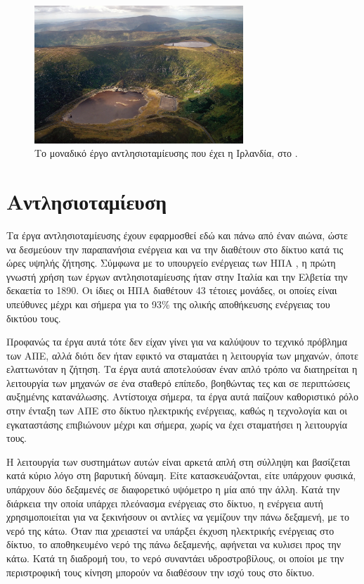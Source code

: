 \documentclass[12pt]{report}
\begin{document}
\begin{figure}[h]
				\center
				\includegraphics[width=0.7\textwidth]{turlough-hill}
				\captionsetup{name=Εικόνα, width=0.8\textwidth}
				\caption{Το μοναδικό έργο αντλησιοταμίευσης που έχει η Ιρλανδία, στο {}.}
				\label{fig:turlough-hill}
\end{figure}

\section{Αντλησιοταμίευση}
Τα έργα αντλησιοταμίευσης έχουν εφαρμοσθεί εδώ και πάνω από έναν αιώνα, ώστε να δεσμεύουν την παραπανήσια ενέργεια και να την διαθέτουν στο δίκτυο κατά τις ώρες υψηλής ζήτησης. 
Σύμφωνα με το υπουργείο ενέργειας των ΗΠΑ \parencite{energygov1801}, η πρώτη γνωστή χρήση των έργων αντλησιοταμίευσης ήταν στην Ιταλία και την Ελβετία την δεκαετία το 1890. Οι ίδιες οι ΗΠΑ διαθέτουν 43 τέτοιες μονάδες, οι
οποίες είναι υπεύθυνες μέχρι και σήμερα για το 93\% της ολικής αποθήκευσης ενέργειας του δικτύου τους. 

Προφανώς τα έργα αυτά τότε δεν είχαν γίνει για να καλύψουν το τεχνικό πρόβλημα των ΑΠΕ, αλλά διότι δεν ήταν εφικτό να
σταματάει η λειτουργία των μηχανών, όποτε ελαττωνόταν η ζήτηση. Τα έργα αυτά αποτελούσαν έναν απλό τρόπο να διατηρείται η λειτουργία των μηχανών σε ένα σταθερό επίπεδο, βοηθώντας τες και σε περιπτώσεις αυξημένης κατανάλωσης.
Αντίστοιχα σήμερα, τα έργα αυτά παίζουν καθοριστικό ρόλο στην ένταξη των ΑΠΕ στο δίκτυο ηλεκτρικής ενέργειας, καθώς η τεχνολογία και οι εγκαταστάσης επιβιώνουν μέχρι και σήμερα, χωρίς να έχει σταματήσει η λειτουργία τους.

Η λειτουργία των συστημάτων αυτών είναι αρκετά απλή στη σύλληψη και βασίζεται κατά κύριο λόγο στη βαρυτική δύναμη. Είτε κατασκευάζονται, είτε υπάρχουν φυσικά, υπάρχουν δύο δεξαμενές σε διαφορετικό υψόμετρο η μία από την άλλη.
Κατά την διάρκεια την οποία υπάρχει πλεόνασμα ενέργειας στο δίκτυο, η ενέργεια αυτή χρησιμοποιείται για να ξεκινήσουν οι αντλίες να γεμίζουν την πάνω δεξαμενή, με το νερό της κάτω. Όταν πια χρειαστεί να υπάρξει έκχυση 
ηλεκτρικής ενέργειας στο δίκτυο, το αποθηκευμένο νερό της πάνω δεξαμενής, αφήνεται να κυλισει προς την κάτω. Κατά τη διαδρομή του, το νερό συναντάει υδροστροβίλους, οι οποίοι με την περιστροφική τους κίνηση μπορούν
να διαθέσουν την ισχύ τους στο δίκτυο. 
\end{document}
